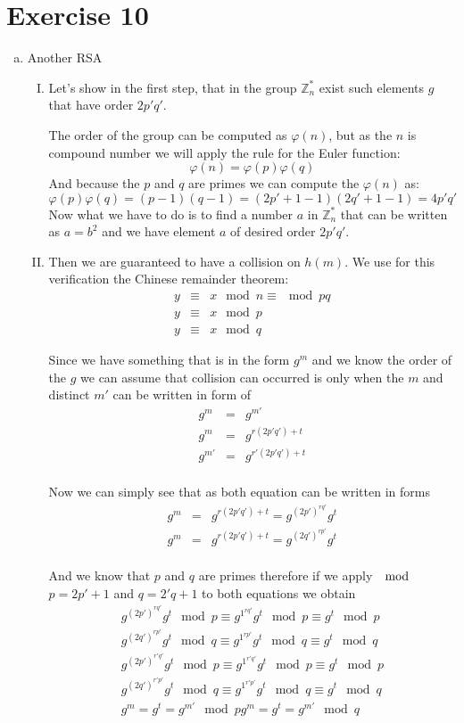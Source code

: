 \documentclass[a4paper,10pt]{article}
\begin{document}
\section*{Exercise 10}
\begin{enumerate}[a)]
\item Another RSA 
\begin{enumerate}[I.]
\item Let's show in the first step, that in the group $\mathds{Z}^*_n$ exist such elements $g$ that have order $2p'q'$.

The order of the group can be computed as $\varphi({n})$, but as the $n$ is compound number we will apply the rule for the Euler function:
$$
\varphi(n) = \varphi(p)\varphi(q)
$$
And because the $p$ and $q$ are primes we can compute the $\varphi(n)$ as:
$$
\varphi(p)\varphi(q) = (p-1)(q-1) = (2p'+1-1)(2q'+1-1) = 4p'q'
$$
Now what we have to do is to find a number $a$ in $\mathds{Z}^*_n$ that can be written as $a=b^2$ and we have element $a$ of desired order $2p'q'$.

\item Then we are guaranteed to have a collision on $h(m)$. We use for this verification the Chinese remainder theorem:
\begin{eqnarray*}
y & \equiv & x \mod n \equiv \mod pq\\
y & \equiv & x \mod p\\
y & \equiv & x \mod q
\end{eqnarray*}

Since we have something that is in the form $g^m$ and we know the order of the $g$ we can assume that collision can occurred is only when the $m$ and distinct $m'$  can be written in form of
\begin{eqnarray*}
g^m &=& g^{m'} \\
g^m &=& g^{r(2p'q') + t}\\
g^{m'} &=& g^{r'(2p'q') + t}\\ 
\end{eqnarray*}

Now we can simply see that as both equation can be written in forms
\begin{eqnarray*}
g^m &=& g^{r(2p'q') + t} = g^{{(2p')}^{rq'}} g^t\\
g^m &=& g^{r(2p'q') + t} = g^{{(2q')}^{rp'}} g^t\\
\end{eqnarray*}

And we know that $p$ and $q$ are primes therefore if we apply $\mod$ $p=2p'+1$ and $q=2'q+1$ to both equations we obtain
\begin{eqnarray*}
g^{{(2p')}^{rq'}} g^t \mod p \equiv g^{1^{rq'}} g^t \mod p \equiv g^t \mod p\\
g^{{(2q')}^{rp'}} g^t \mod q \equiv g^{1^{rp'}} g^t \mod q \equiv g^t \mod q\\
g^{{(2p')}^{r'q'}} g^t \mod p \equiv g^{1^{r'q'}} g^t \mod p \equiv g^t \mod p\\
g^{{(2q')}^{r'p'}} g^t \mod q \equiv g^{1^{r'p'}} g^t \mod q \equiv g^t \mod q\\
g^m = g^t = g^{m'} \mod p
g^m = g^t = g^{m'} \mod q
\end{eqnarray*}


\end{enumerate}
\end{enumerate}
\end{document}

